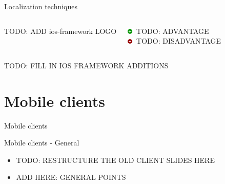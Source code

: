 \documentclass[11pt]{beamer}
\begin{document}
\begin{frame}{Localization techniques}

  \begin{columns}[c]


    TODO: ADD ios-framework LOGO

    \hfill

    \begin{column}{0.8\textwidth}

      \includegraphics[width=0.05\textwidth]{plus} TODO: ADVANTAGE\\
      \includegraphics[width=0.05\textwidth]{minus} TODO: DISADVANTAGE

    \end{column}

  \end{columns}

  TODO: FILL IN IOS FRAMEWORK ADDITIONS

\end{frame}


\section{Mobile clients}

\begin{frame}{}

  \begin{center}

    {\Huge Mobile clients}

  \end{center}

\end{frame}


\begin{frame}{Mobile clients - General}

  \begin{itemize}

    \item TODO: RESTRUCTURE THE OLD CLIENT SLIDES HERE
    \item ADD HERE: GENERAL POINTS

  \end{itemize}

\end{frame}
\end{document}
